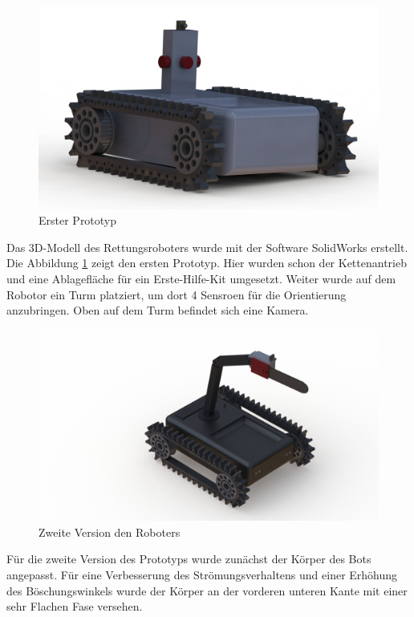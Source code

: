 \begin{figure}[h]
    \centering
    \captionsetup{width=.9\linewidth}
    \includegraphics[width=1\linewidth]{v2_rendering.JPG}
    \caption{Erster Prototyp}
    \label{fig:prot}
\end{figure}

Das 3D-Modell des Rettungsroboters wurde mit der Software SolidWorks erstellt. Die Abbildung \ref{fig:prot} zeigt den ersten Prototyp. Hier wurden schon der Kettenantrieb und eine Ablagefläche für ein Erste-Hilfe-Kit umgesetzt. Weiter wurde auf dem Robotor ein Turm platziert, um dort 4 Sensroen für die Orientierung anzubringen. Oben auf dem Turm befindet sich eine Kamera.\\


\begin{figure}[h]
    \centering
    \captionsetup{width=.9\linewidth}
    \includegraphics[width=1\linewidth]{bot_rendering_v4.JPG}
    \caption{Zweite Version den Roboters}
    \label{fig:second}
\end{figure}

Für die zweite Version des Prototyps wurde zunächst der Körper des Bots angepasst. Für eine Verbesserung des Strömungsverhaltens und einer Erhöhung des Böschungswinkels wurde der Körper an der vorderen unteren Kante mit einer sehr Flachen Fase versehen.

